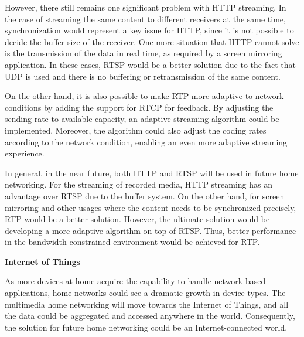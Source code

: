 However, there still remains one significant problem with HTTP streaming. In the
case of streaming the same content to different receivers at the same time,
synchronization would represent a key issue for HTTP, since it is not possible
to decide the buffer size of the receiver. One more situation that HTTP cannot
solve is the transmission of the data in real time, as required by a screen
mirroring application. In these cases, RTSP would be a better solution due to
the fact that UDP is used and there is no buffering or retransmission of the
same content.

On the other hand, it is also possible to make RTP more adaptive to network
conditions by adding the support for RTCP for feedback. By adjusting the
sending rate to available capacity, an adaptive streaming algorithm could be
implemented. Moreover, the algorithm could also adjust the coding rates
according to the network condition, enabling an even more adaptive streaming
experience.

In general, in the near future, both HTTP and RTSP will be used in future home
networking. For the streaming of recorded media, HTTP streaming has an
advantage over RTSP due to the buffer system. On the other hand, for screen
mirroring and other usages where the content needs to be synchronized
precisely, RTP would be a better solution. However, the ultimate solution would
be developing a more adaptive algorithm on top of RTSP. Thus, better performance
in the bandwidth constrained environment would be achieved for RTP.

\textbf{Internet of Things}

As more devices at home acquire the capability to handle network based
applications, home networks could see a dramatic growth in device types. The
multimedia home networking will move towards the Internet of Things, and all
the data could be aggregated and accessed anywhere in the world. Consequently,
the solution for future home networking could be an Internet-connected
world.
